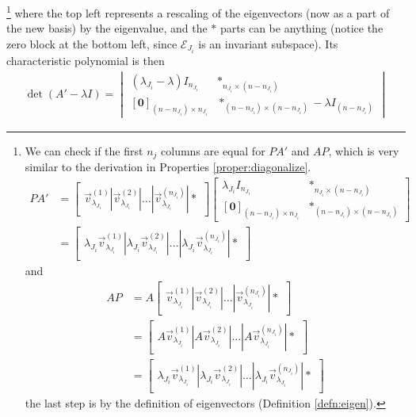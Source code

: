 \footnote{We can check if the first $n_j$ columns are equal for $PA'$ and $AP$, which is very similar to the derivation in Properties \ref{proper:diagonalize}.
\begin{align*}
PA' &= \begin{bmatrix}
\vec{v}_{\lambda_{J_i}}^{(1)}|\vec{v}_{\lambda_{J_i}}^{(2)}|\ldots|\vec{v}_{\lambda_{J_i}}^{(n_{J_i})}|*
\end{bmatrix}
\begin{bmatrix}
\lambda_{J_i} I_{n_{J_i}} & *_{n_{J_i}\times(n-n_{J_i})} \\
[\textbf{0}]_{(n-n_{J_i})\times n_{J_i}} & *_{(n-n_{J_i})\times(n-n_{J_i})}
\end{bmatrix} \\
&=
\begin{bmatrix}
\lambda_{J_i}\vec{v}_{\lambda_{J_i}}^{(1)}|\lambda_{J_i}\vec{v}_{\lambda_{J_i}}^{(2)}|\ldots|\lambda_{J_i}\vec{v}_{\lambda_{J_i}}^{(n_{J_i})}|*
\end{bmatrix}
\end{align*} and
\begin{align*}
AP &= A\begin{bmatrix}
\vec{v}_{\lambda_{J_i}}^{(1)}|\vec{v}_{\lambda_{J_i}}^{(2)}|\ldots|\vec{v}_{\lambda_{J_i}}^{(n_{J_i})}|*
\end{bmatrix} \\
&= 
\begin{bmatrix}
A\vec{v}_{\lambda_{J_i}}^{(1)}|A\vec{v}_{\lambda_{J_i}}^{(2)}|\ldots|A\vec{v}_{\lambda_{J_i}}^{(n_{J_i})}|*
\end{bmatrix} \\
&= \begin{bmatrix}
\lambda_{J_i}\vec{v}_{\lambda_{J_i}}^{(1)}|\lambda_{J_i}\vec{v}_{\lambda_{J_i}}^{(2)}|\ldots|\lambda_{J_i}\vec{v}_{\lambda_{J_i}}^{(n_{J_i})}|*
\end{bmatrix}
\end{align*}
the last step is by the definition of eigenvectors (Definition \ref{defn:eigen}).} 
where the top left represents a rescaling of the eigenvectors (now as a part of the new basis) by the eigenvalue, and the $*$ parts can be anything (notice the zero block at the bottom left, since $\mathcal{E}_{J_i}$ is an invariant subspace). Its characteristic polynomial is then 
\begin{align*}
\det(A'-\lambda I) =
\begin{vmatrix}
(\lambda_{J_i}-\lambda) I_{n_{J_i}} & *_{n_{J_i}\times(n-n_{J_i})} \\
[\textbf{0}]_{(n-n_{J_i})\times n_{J_i}} & *_{(n-n_{J_i})\times(n-n_{J_i})}-\lambda I_{(n-n_{J_i})}    
\end{vmatrix}
\end{align*}
